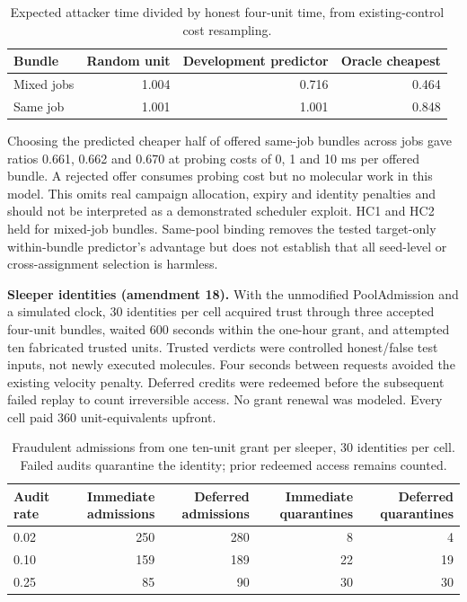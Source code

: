 \documentclass[11pt]{article}
\newcommand{\botrule}{\bottomrule}
\begin{document}
\begin{table}[htbp]
\caption{Expected attacker time divided by honest four-unit time, from existing-control cost resampling.}
\centering
\small
\begin{tabularx}{\textwidth}{Xrrr}
\toprule
Bundle & Random unit & Development predictor & Oracle cheapest \\
\midrule
Mixed jobs & 1.004 & 0.716 & 0.464 \\
Same job & 1.001 & 1.001 & 0.848 \\
\botrule
\end{tabularx}
\end{table}

Choosing the predicted cheaper half of offered same-job bundles across jobs gave ratios 0.661, 0.662 and 0.670 at probing costs of 0, 1 and 10 ms per offered bundle. A rejected offer consumes probing cost but no molecular work in this model. This omits real campaign allocation, expiry and identity penalties and should not be interpreted as a demonstrated scheduler exploit. HC1 and HC2 held for mixed-job bundles. Same-pool binding removes the tested target-only within-bundle predictor's advantage but does not establish that all seed-level or cross-assignment selection is harmless.

\textbf{Sleeper identities (amendment 18).} With the unmodified PoolAdmission and a simulated clock, 30 identities per cell acquired trust through three accepted four-unit bundles, waited 600 seconds within the one-hour grant, and attempted ten fabricated trusted units. Trusted verdicts were controlled honest/false test inputs, not newly executed molecules. Four seconds between requests avoided the existing velocity penalty. Deferred credits were redeemed before the subsequent failed replay to count irreversible access. No grant renewal was modeled. Every cell paid 360 unit-equivalents upfront.

\begin{table}[htbp]
\caption{Fraudulent admissions from one ten-unit grant per sleeper, 30 identities per cell. Failed audits quarantine the identity; prior redeemed access remains counted.}
\centering
\small
\begin{tabularx}{\textwidth}{Xrrrr}
\toprule
Audit rate & Immediate admissions & Deferred admissions & Immediate quarantines & Deferred quarantines \\
\midrule
0.02 & 250 & 280 & 8 & 4 \\
0.10 & 159 & 189 & 22 & 19 \\
0.25 & 85 & 90 & 30 & 30 \\
\botrule
\end{tabularx}
\end{table}
\end{document}
